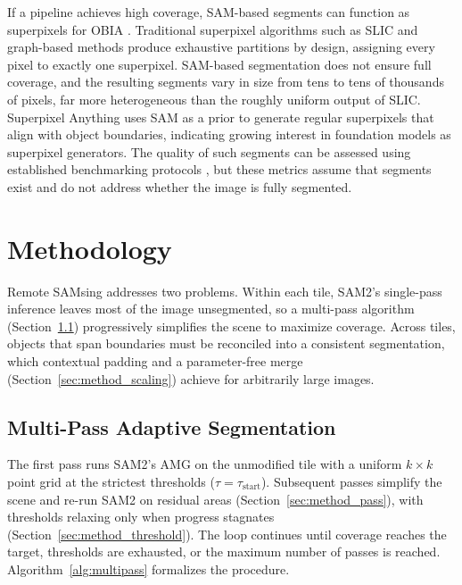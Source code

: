 \documentclass[review,11pt,authoryear]{elsarticle}
\begin{document}
If a pipeline achieves high coverage, SAM-based segments can function as superpixels for OBIA \citep{blaschke2010obia, benz2004ecognition, baatz2000multiresolution}. Traditional superpixel algorithms \citep{ren2003superpixel} such as SLIC \citep{achanta2012slic} and graph-based methods \citep{felzenszwalb2004efficient} produce exhaustive partitions by design, assigning every pixel to exactly one superpixel. SAM-based segmentation does not ensure full coverage, and the resulting segments vary in size from tens to tens of thousands of pixels, far more heterogeneous than the roughly uniform output of SLIC. Superpixel Anything \citep{walther2025superpixelanything} uses SAM as a prior to generate regular superpixels that align with object boundaries, indicating growing interest in foundation models as superpixel generators. The quality of such segments can be assessed using established benchmarking protocols \citep{stutz2018superpixels}, but these metrics assume that segments exist and do not address whether the image is fully segmented.


\section{Methodology}
\label{sec:methodology}

Remote SAMsing addresses two problems. Within each tile, SAM2's single-pass inference leaves most of the image unsegmented, so a multi-pass algorithm (Section~\ref{sec:method_multipass}) progressively simplifies the scene to maximize coverage. Across tiles, objects that span boundaries must be reconciled into a consistent segmentation, which contextual padding and a parameter-free merge (Section~\ref{sec:method_scaling}) achieve for arbitrarily large images.

\subsection{Multi-Pass Adaptive Segmentation}
\label{sec:method_multipass}

The first pass runs SAM2's AMG on the unmodified tile with a uniform $k \times k$ point grid at the strictest thresholds ($\tau = \tau_{\text{start}}$). Subsequent passes simplify the scene and re-run SAM2 on residual areas (Section~\ref{sec:method_pass}), with thresholds relaxing only when progress stagnates (Section~\ref{sec:method_threshold}). The loop continues until coverage reaches the target, thresholds are exhausted, or the maximum number of passes is reached. Algorithm~\ref{alg:multipass} formalizes the procedure.
\end{document}
